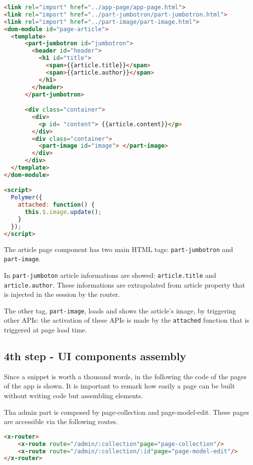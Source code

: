 \begin{lstlisting}[language=html]
<link rel="import" href="../app-page/app-page.html">
<link rel="import" href="../part-jumbotron/part-jumbotron.html">
<link rel="import" href="../part-image/part-image.html">
<dom-module id="page-article">
  <template>
      <part-jumbotron id="jumbotron">
        <header id="header">
          <h1 id="title">
            <span>{{article.title}}</span>
            <span>{{article.author}}</span>
          </h1>
        </header>
      </part-jumbotron>

      <div class="container">
        <div>
          <p id= "content"> {{article.content}}</p>
        </div>
        <div class="container">
          <part-image id="image"> </part-image>
        </div> 
      </div>
  </template>
</dom-module>

<script>
  Polymer({
    attached: function() {
      this.$.image.update();
    }
  });
</script>
\end{lstlisting}



The article page component has two main HTML tags: \texttt{part-jumbotron} and \texttt{part-image}.

In \texttt{part-jumboton} article informations are showed: \texttt{{{article.title}}} and \texttt{{{article.author}}}. These informations are extrapolated from article property that is injected in the session by the router.

The other tag, \texttt{part-image}, loads and shows the article's image, by triggering other APIs: the activation of these APIs is made by the \texttt{attached} function that is triggered at page load time.



\subsection{4th step - UI components assembly}

Since a snippet is worth a thousand words, in the following the code of the pages of the app is shown. It is important to remark how easily a page can be built without writing code but assembling elements.

Tha admin part is composed by page-collection and page-model-edit. These pages are accessible via the following routes.

\begin{lstlisting}[language=html]
<x-router>
	<x-route route="/admin/:collection"page="page-collection"/>
	<x-route route="/admin/:collection/:id"page="page-model-edit"/>
</x-router>
\end{lstlisting}


